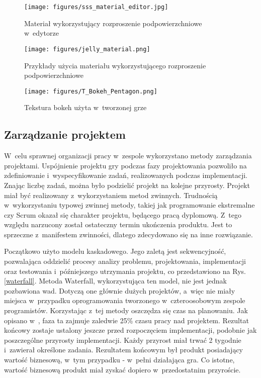\begin{figure}
\begin{center}
\texttt{[image: figures/sss\_material\_editor.jpg]}
\caption{Materiał wykorzystujący rozproszenie podpowierzchniowe w~edytorze}
\label{sss_material_editor}
\end{center}
\end{figure}

\begin{figure}
\begin{center}
\texttt{[image: figures/jelly\_material.png]}
\caption{Przykłady użycia materiału wykorzystującego rozproszenie podpowierzchniowe}
\label{sss_material_example}
\end{center}
\end{figure}

\begin{figure}
\begin{center}
\texttt{[image: figures/T\_Bokeh\_Pentagon.png]}
\caption{Tekstura bokeh użyta w~tworzonej grze}
\label{bokeh_texture}
\end{center}
\end{figure}

\subsection{Zarządzanie projektem}
W~celu sprawnej organizacji pracy w~zespole wykorzystano metody zarządzania projektami. Uspójnienie projektu gry podczas fazy projektowania pozwoliło na zdefiniowanie i~wyspecyfikowanie zadań, realizowanych podczas implementacji. Znając liczbę zadań, można było podzielić projekt na kolejne przyrosty. Projekt miał być realizowany z~wykorzystaniem metod zwinnych. Trudnością w~wykorzystaniu typowej zwinnej metody, takiej jak programowanie ekstremalne czy Scrum okazał się charakter projektu, będącego pracą dyplomową. Z~tego względu narzucony został ostateczny termin ukończenia produktu. Jest to sprzeczne z~manifestem zwinności, dlatego zdecydowano się na inne rozwiązanie.

Początkowo użyto modelu kaskadowego. Jego zaletą jest sekwencyjność, pozwalająca oddzielić procesy analizy problemu, projektowania, implementacji oraz testowania i~późniejszego utrzymania projektu, co przedstawiono na Rys. \ref{waterfall}. Metoda Waterfall, wykorzystująca ten model, nie jest jednak pozbawiona wad. Dotyczą one głównie dużych projektów, a~więc nie miały miejsca w~przypadku oprogramowania tworzonego w~czteroosobowym zespole programistów. Korzystając z~tej metody oszczędza się czas na planowaniu. Jak opisano w~\cite{Kaczor:Scrum}, faza ta zajmuje zaledwie 25\% czasu pracy nad projektem. Rezultat końcowy zostaje ustalony jeszcze przed rozpoczęciem implementacji, podobnie jak poszczególne przyrosty implementacji. Każdy przyrost miał trwać 2 tygodnie i~zawierał określone zadania. Rezultatem końcowym był produkt posiadający wartość biznesową, w~tym przypadku - w~pełni działająca gra. Co istotne, wartość biznesową produkt miał zyskać dopiero w~przedostatnim przyroście. 

